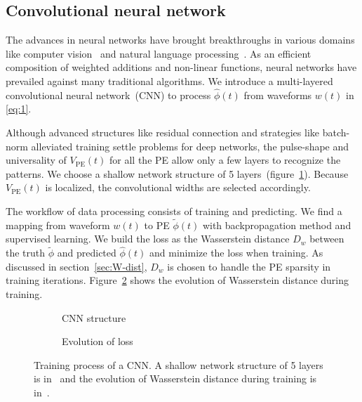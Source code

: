 \subsection{Convolutional neural network}

The advances in neural networks have brought breakthroughs in various domains like computer vision~\cite{he_deep_2015} and natural language processing~\cite{vaswani_attention_2017}. As an efficient composition of weighted additions and non-linear functions, neural networks have prevailed against many traditional algorithms. We introduce a multi-layered convolutional neural network~(CNN) to process $\hat{\phi}(t)$ from waveforms $w(t)$ in \eqref{eq:1}. 

Although advanced structures like residual connection and strategies like batch-norm alleviated training settle problems for deep networks, the pulse-shape and universality of $V_\mathrm{PE}(t)$ for all the PE allow only a few layers to recognize the patterns. We choose a shallow network structure of 5 layers~(figure~\ref{fig:struct}). Because $V_\mathrm{PE}(t)$ is localized, the convolutional widths are selected accordingly. 

The workflow of data processing consists of training and predicting. We find a mapping from waveform $w(t)$ to PE $\tilde{\phi}(t)$ with backpropagation method and supervised learning. We build the loss as the Wasserstein distance $D_w$ between the truth $\tilde{\phi}$ and predicted $\hat{\phi}(t)$ and minimize the loss when training. As discussed in section~\ref{sec:W-dist}, $D_w$ is chosen to handle the PE sparsity in training iterations. Figure~\ref{fig:loss} shows the evolution of Wasserstein distance during training. 

\begin{figure}[H]
  \begin{subfigure}{0.35\textwidth}
    \centering
    \begin{adjustbox}{width=0.65\textwidth}
      
    \end{adjustbox}
    \caption{\label{fig:struct} CNN structure}
  \end{subfigure}
  \begin{subfigure}{0.6\textwidth}
    \centering
    \resizebox{\textwidth}{!}{}
    \caption{\label{fig:loss} Evolution of loss}
  \end{subfigure}
  \caption{\label{fig:CNN} Training process of a CNN. A shallow network structure of 5 layers is in~ and the evolution of Wasserstein distance during training is in~.}
\end{figure}

